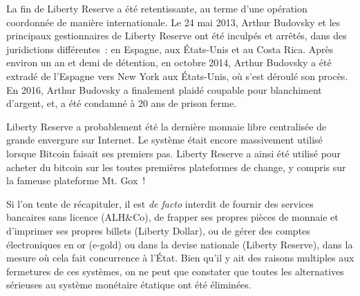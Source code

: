 La fin de Liberty Reserve a été retentissante, au terme d'une opération coordonnée de manière internationale. Le 24 mai 2013, Arthur Budovsky et les principaux gestionnaires de Liberty Reserve ont été inculpés et arrêtés, dans des juridictions différentes~: en Espagne, aux États-Unis et au Costa Rica. Après environ un an et demi de détention, en octobre 2014, Arthur Budovsky a été extradé de l'Espagne vers New York aux États-Unis, où s'est déroulé son procès. En 2016, Arthur Budovsky a finalement plaidé coupable pour blanchiment d'argent, et, a été condamné à 20 ans de prison ferme.

Liberty Reserve a probablement été la dernière monnaie libre centralisée de grande envergure sur Internet. Le système était encore massivement utilisé lorsque Bitcoin faisait ses premiers pas. Liberty Reserve a ainsi été utilisé pour acheter du bitcoin sur les toutes premières plateformes de change, y compris sur la fameuse plateforme Mt. Gox~!


Si l'on tente de récapituler, il est \emph{de facto} interdit de fournir des services bancaires sans licence (ALH\&Co), de frapper ses propres pièces de monnaie et d'imprimer ses propres billets (Liberty Dollar), ou de gérer des comptes électroniques en or (e-gold) ou dans la devise nationale (Liberty Reserve), dans la mesure où cela fait concurrence à l'État. Bien qu'il y ait des raisons multiples aux fermetures de ces systèmes, on ne peut que constater que toutes les alternatives sérieuses au système monétaire étatique ont été éliminées.

